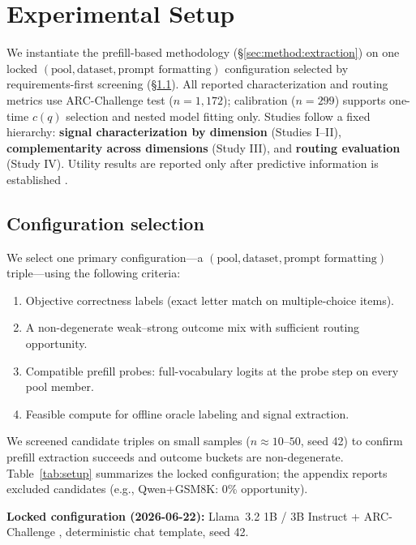 
\section{Experimental Setup}
\label{sec:setup}

We instantiate the prefill-based methodology (\S\ref{sec:method:extraction}) on one locked $(\text{pool}, \text{dataset}, \text{prompt formatting})$ configuration selected by requirements-first screening (\S\ref{sec:setup:config}).
All reported characterization and routing metrics use ARC-Challenge test ($n{=}1{,}172$); calibration ($n{=}299$) supports one-time $c(q)$ selection and nested model fitting only.
Studies follow a fixed hierarchy: \textbf{signal characterization by dimension} (Studies I--II), \textbf{complementarity across dimensions} (Study III), and \textbf{routing evaluation} (Study IV).
Utility results are reported only after predictive information is established \citep{hu2024routerbench}.

\subsection{Configuration selection}
\label{sec:setup:config}

We select one primary configuration---a $(\text{pool}, \text{dataset}, \text{prompt formatting})$ triple---using the following criteria:
\begin{enumerate}
  \item Objective correctness labels (exact letter match on multiple-choice items).
  \item A non-degenerate weak--strong outcome mix with sufficient routing opportunity.
  \item Compatible prefill probes: full-vocabulary logits at the probe step on every pool member.
  \item Feasible compute for offline oracle labeling and signal extraction.
\end{enumerate}

We screened candidate triples on small samples ($n \approx 10$--$50$, seed 42) to confirm prefill extraction succeeds and outcome buckets are non-degenerate.
Table~\ref{tab:setup} summarizes the locked configuration; the appendix reports excluded candidates (e.g., Qwen+GSM8K: 0\% opportunity).

\textbf{Locked configuration (2026-06-22):} Llama~3.2 1B / 3B Instruct + ARC-Challenge \citep{clark2018think}, deterministic chat template, seed 42.

